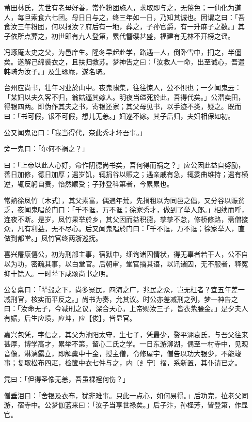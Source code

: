 \documentclass[letterpaper,12pt,english]{sphinxmanual}
\begin{document}
莆田林氏，先世有老母好善，常作粉团施人，求取即与之，无倦色；一仙化为道人，每旦索食六七团。母日日与之，终三年如一日，乃知其诚也。因谓之曰：「吾食汝三年粉团，何以报汝？府后有一地，葬之，子孙官爵，有一升麻子之数。」其子依所点葬之，初世即有九人登第，累代簪缨甚盛，福建有无林不开榜之谣。

冯琢庵太史之父，为邑庠生。隆冬早起赴学，路遇一人，倒卧雪中，扪之，半僵矣。遂解己绵裘衣之，且扶归救苏。梦神告之曰：「汝救人一命，出至诚心，吾遣韩琦为汝子。」及生琢庵，遂名琦。

台州应尚书，壮年习业於山中。夜鬼啸集，往往惊人，公不惧也；一夕闻鬼云：「某妇以夫久客不归，翁姑逼其嫁人。明夜当缢死於此，吾得代矣。」公潜卖田，得银四两。即伪作其夫之书，寄银还家；其父母见书，以手迹不类，疑之。既而曰：「书可假，银不可假，想儿无恙。」妇遂不嫁。其子后归，夫妇相保如初。

公又闻鬼语曰：「我当得代，奈此秀才坏吾事。」

旁一鬼曰：「尔何不祸之？」

曰：「上帝以此人心好，命作阴德尚书矣，吾何得而祸之？」应公因此益自努励，善日加修，德日加厚；遇岁饥，辄捐谷以赈之；遇亲戚有急，辄委曲维持；遇有横逆，辄反躬自责，怡然顺受；子孙登科第者，今累累也。

常熟徐凤竹〔木式〕，其父素富，偶遇年荒，先捐租以为同邑之倡，又分谷以赈贫乏，夜闻鬼唱於门曰：「千不诓，万不诓；徐家秀才，做到了举人郎。」相续而呼，连夜不断。是岁，凤竹果举於乡，其父因而益积德，孳孳不怠，修桥修路，斋僧接众，凡有利益，无不尽心。后又闻鬼唱於门曰：「千不诓，万不诓；徐家举人，直做到都堂。」凤竹官终两浙巡抚。

喜兴屠康僖公，初为刑部主事，宿狱中，细询诸囚情状，得无辜者若干人，公不自以为功，密疏其事，以白堂官。后朝审，堂官摘其语，以讯诸囚，无不服者，释冤抑十馀人。一时辇下咸颂尚书之明。

公复禀曰：「辇毂之下，尚多冤民，四海之广，兆民之众，岂无枉者？宜五年差一减刑官，核实而平反之。」尚书为奏，允其议。时公亦差减刑之列，梦一神告之曰：「汝命无子，今减刑之议，深合天心，上帝赐汝三子，皆衣紫腰金。」是夕夫人有娠，后生应埙，应坤，应【俊】，皆显官。

嘉兴包凭，字信之，其父为池阳太守，生七子，凭最少，赘平湖袁氏，与吾父往来甚厚，博学高才，累举不第，留心二氏之学。一日东游泖湖，偶至一村寺中，见观音像，淋漓露立，即解橐中十金，授主僧，令修屋宇，僧告以功大银少，不能竣事；复取松布四疋，检箧中衣七件与之，内〔纟宁〕褶，系新置，其仆请已之。

凭曰：「但得圣像无恙，吾虽裸裎何伤？」

僧垂泪曰：「舍银及衣布，犹非难事。只此一点心，如何易得。」后功完，拉老父同游，宿寺中。公梦伽蓝来曰：「汝子当享世禄矣。」后子汴，孙柽芳，皆登第，作显官。
\end{document}
